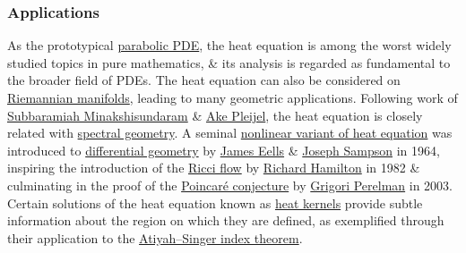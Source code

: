 \documentclass{article}
\begin{document}
\subsubsection{Applications}
As the prototypical \href{https://en.wikipedia.org/wiki/Parabolic_partial_differential_equation}{parabolic PDE}, the heat equation is among the worst widely studied topics in pure mathematics, \& its analysis is regarded as fundamental to the broader field of PDEs. The heat equation can also be considered on \href{https://en.wikipedia.org/wiki/Riemannian_manifold}{Riemannian manifolds}, leading to many geometric applications. Following work of \href{https://en.wikipedia.org/wiki/Subbaramiah_Minakshisundaram}{\sc Subbaramiah Minakshisundaram} \& \href{https://en.wikipedia.org/wiki/%C3%85ke_Pleijel}{\sc Ake Pleijel}, the heat equation is closely related with \href{https://en.wikipedia.org/wiki/Spectral_geometry}{spectral geometry}. A seminal \href{https://en.wikipedia.org/wiki/Harmonic_map}{nonlinear variant of heat equation} was introduced to \href{https://en.wikipedia.org/wiki/Differential_geometry}{differential geometry} by \href{https://en.wikipedia.org/wiki/James_Eells}{\sc James Eells} \& \href{https://en.wikipedia.org/wiki/Joseph_H._Sampson}{\sc Joseph Sampson} in 1964, inspiring the introduction of the \href{https://en.wikipedia.org/wiki/Ricci_flow}{Ricci flow} by \href{https://en.wikipedia.org/wiki/Richard_S._Hamilton}{\sc Richard Hamilton} in 1982 \& culminating in the proof of the \href{https://en.wikipedia.org/wiki/Poincar%C3%A9_conjecture}{Poincar\'e conjecture} by \href{https://en.wikipedia.org/wiki/Grigori_Perelman}{\sc Grigori Perelman} in 2003. Certain solutions of the heat equation known as \href{https://en.wikipedia.org/wiki/Heat_kernel}{heat kernels} provide subtle information about the region on which they are defined, as exemplified through their application to the \href{https://en.wikipedia.org/wiki/Atiyah%E2%80%93Singer_index_theorem}{Atiyah--Singer index theorem}.
\end{document}
